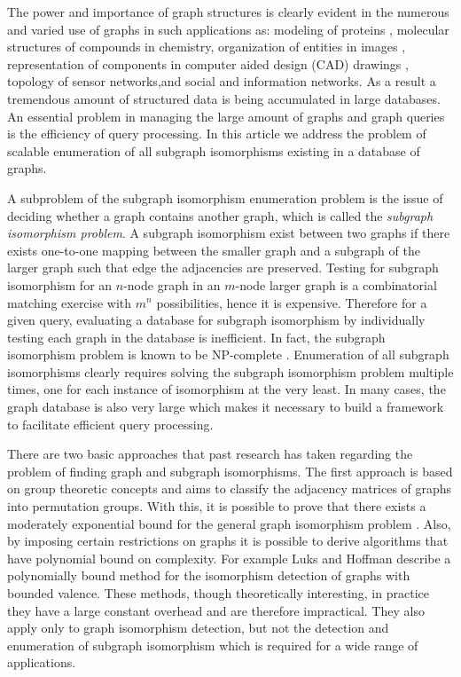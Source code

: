 The power and importance of graph structures is clearly evident in the numerous and varied use of graphs in such applications as: modeling of proteins
\cite{chi_muntz_nijssen2005}, molecular structures of compounds in chemistry\cite{willet_barnard_john1998}\cite{agrafiotis2007}, organization of entities 
in images\cite{petrakis_faloutsos1997} \cite{burge_kropatsch1999}, representation of components in computer aided design (CAD) drawings \cite{cordella2000}, 
topology of sensor networks\cite{li_wan_wang2003},and social and information networks\cite{cai_he_yan2005}. As a result a tremendous amount of structured 
data is being accumulated in large databases. An essential problem in managing the large amount of graphs and graph queries is the efficiency of query 
processing. In this article we address the problem of scalable enumeration of all subgraph isomorphisms existing in a database of graphs.

A subproblem of the subgraph isomorphism enumeration problem is the issue of deciding whether a graph contains another graph, which is called the 
\textit{subgraph isomorphism problem}. A subgraph isomorphism exist between two 
graphs if there exists one-to-one mapping between the smaller graph and a subgraph of the larger graph such that edge the adjacencies are preserved. 
Testing for subgraph isomorphism for an $n$-node graph in an $m$-node larger graph is a combinatorial matching exercise with $m^n$ possibilities, hence it is 
expensive. Therefore for a given query, evaluating a database for subgraph  isomorphism by individually testing each graph  in the database is 
inefficient.  In fact, the subgraph isomorphism problem is known to be NP-complete \cite{cook1971_np}. Enumeration of all subgraph isomorphisms clearly requires 
solving the subgraph isomorphism problem multiple times, one for each instance of isomorphism at the very least. In  many cases, the graph database is also very 
large which makes it necessary to build a framework to facilitate efficient query processing.

There are two basic approaches that past research has taken regarding the problem of finding graph and subgraph isomorphisms. The first approach is based on 
group theoretic concepts and aims to classify the adjacency matrices of graphs into permutation groups. With this, it is possible to prove that there exists 
a moderately exponential bound for the general graph isomorphism problem \cite{babai1981}. Also, by imposing certain restrictions on graphs it is possible to 
derive algorithms that have polynomial bound on complexity. For example  Luks and Hoffman\cite{hoffmann1982} describe a polynomially bound method for the 
isomorphism detection of graphs with bounded valence. These methods, though theoretically interesting, in practice they have a large constant overhead and 
are therefore impractical. They also apply only to graph isomorphism detection, but not the detection and enumeration of subgraph isomorphism which is 
required for a wide range of applications.


